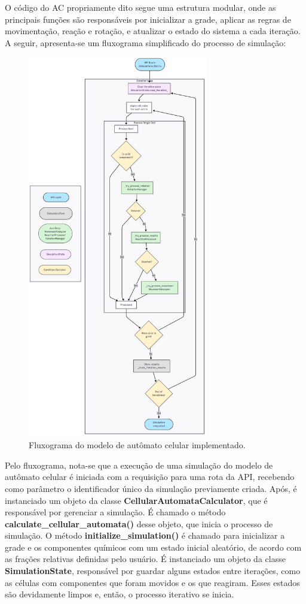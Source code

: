 \documentclass[12pt,oneside]{report}
\begin{document}
O código do AC propriamente dito segue uma estrutura modular, onde as principais funções são responsáveis por inicializar a grade, aplicar as regras de movimentação, reação e rotação, e atualizar o estado do sistema a cada iteração. A seguir, apresenta-se um fluxograma simplificado do processo de simulação:

\begin{figure}[H]
    \centering
    \includegraphics[width=0.7\textwidth]{fluxograma.png}
    \caption{Fluxograma do modelo de autômato celular implementado.}
    \label{fig:fluxograma}
\end{figure}

Pelo fluxograma, nota-se que a execução de uma simulação do modelo de autômato celular é iniciada com a requisição para uma rota da API, recebendo como parâmetro o identificador único da simulação previamente criada. Após, é instanciado um objeto da classe \textbf{CellularAutomataCalculator}, que é responsável por gerenciar a simulação. É chamado o método \textbf{calculate\_cellular\_automata()} desse objeto, que inicia o processo de simulação. O método \textbf{initialize\_simulation()} é chamado para inicializar a grade e os componentes químicos com um estado inicial aleatório, de acordo com as frações relativas definidas pelo usuário. É instanciado um objeto da classe \textbf{SimulationState}, responsável por guardar alguns estados entre iterações, como as células com componentes que foram movidos e os que reagiram. Esses estados são devidamente limpos e, então, o processo iterativo se inicia.
\end{document}
